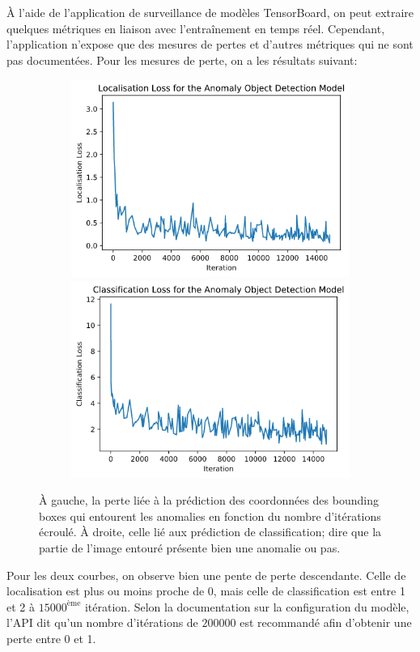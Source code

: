 \documentclass[french]{article}
\theoremstyle{mytheoremstyle}
\theoremstyle{mytheoremstyle}
\theoremstyle{myproblemstyle}
\begin{document}
    À l'aide de l'application de surveillance de modèles TensorBoard, on peut extraire quelques métriques en liaison avec l'entraînement en temps réel. Cependant, l'application n'expose que des mesures de pertes et d'autres métriques qui ne sont pas documentées. Pour les mesures de perte, on a les résultats suivant:
    \begin{figure}[H]
        \centering
        \begin{subfigure}{\linewidth}
            \includegraphics[width=.5\textwidth]{images/od_loc_loss.png}
            \hfill
            \includegraphics[width=.5\textwidth]{images/od_cla_loss.png}
        \end{subfigure}
        \caption{À gauche, la perte liée à la prédiction des coordonnées des bounding boxes qui entourent les anomalies en fonction du nombre d'itérations écroulé. À droite, celle lié aux prédiction de classification; dire que la partie de l'image entouré présente bien une anomalie ou pas.}
    \end{figure}
    Pour les deux courbes, on observe bien une pente de perte descendante. Celle de localisation est plus ou moins proche de 0, mais celle de classification est entre 1 et 2 à $15000^{\text{ème}}$ itération. Selon la documentation sur la configuration du modèle, l'API dit qu'un nombre d'itérations de $200000$ est recommandé afin d'obtenir une perte entre 0 et 1.
    \newline
\end{document}
